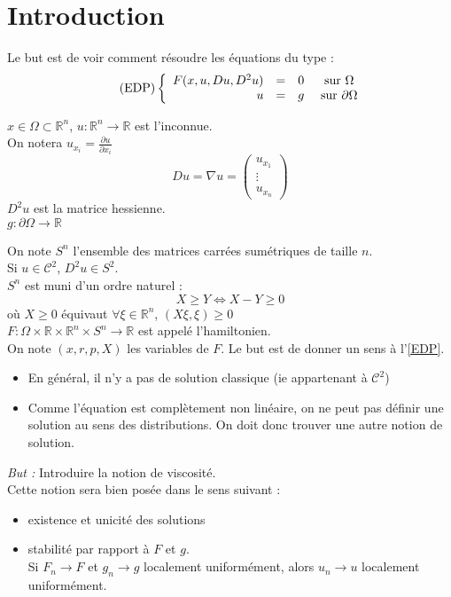 \part*{Introduction}
Le but est de voir comment résoudre les équations du type :
\begin{equation} \label{EDP} \tag{EDP} 
\left\{ \begin{array}{r c c c}
	F(x,u,Du,D^2u)&=&0 &\text{ sur } \Omega\\
	u&=&g &\text{ sur } \partial\Omega
\end{array}\right.
\end{equation}

$x\in\Omega\subset\mathbb{R}^n$, $u:\mathbb{R}^n\to\mathbb{R}$ est l'inconnue.\\
On notera $u_{x_i}=\frac{\partial u}{\partial x_i}$\\
\[Du=\nabla u=\begin{pmatrix} u_{x_1}\\ \vdots \\ u_{x_n} \end{pmatrix}\]
$D^2u$ est la matrice hessienne.\\
$g:\partial\Omega\to\mathbb{R}$

\bigskip
On note $S^n$ l'ensemble des matrices carrées sumétriques de taille $n$.\\
Si $u\in\mathscr{C}^2$, $D^2u\in S^2$.\\
$S^n$ est muni d'un ordre naturel :
	\[X\geq Y \Leftrightarrow X-Y\geq 0\]
où $X\geq0$ équivaut $\forall \xi\in\mathbb{R}^n$, $(X\xi,\xi)\geq0$\\

$F:\Omega\times\mathbb{R}\times\mathbb{R}^n\times S^n \to \mathbb{R}$ est appelé l'hamiltonien.\\
On note $(x,r,p,X)$ les variables de $F$. Le but est de donner un sens à l'\ref{EDP}.

\begin{itemize}
	\item En général, il n'y a pas de solution classique (ie appartenant à $\mathscr{C}^2$)
	\item Comme l'équation est complètement non linéaire, on ne peut pas définir une solution au sens des distributions. On doit donc trouver une autre notion de solution.
\end{itemize}

\bigskip
\textit{But :} Introduire la notion de viscosité.\\
Cette notion sera bien posée dans le sens suivant :
\begin{itemize}
	\item existence et unicité des solutions
	\item stabilité par rapport à $F$ et $g$.\\
Si $F_n\to F$ et $g_n\to g$ localement uniformément, alors $u_n\to u$ localement uniformément.
\end{itemize}

